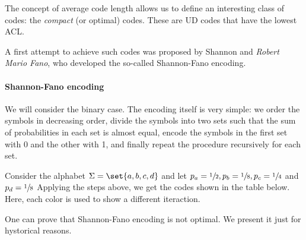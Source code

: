 \documentclass{subfiles}
\begin{document}
    The concept of average code length allows us to define an interesting class of  codes:
        the \emph{compact} (or optimal) codes.
        These are UD codes that have the lowest ACL.

    A first attempt to achieve such codes was proposed by Shannon and \emph{Robert Mario Fano},
        who developed the so-called Shannon-Fano encoding.

    \paragraph{Shannon-Fano encoding}
    We will consider the binary case. 
        The encoding itself is very simple: we order the symbols in decreasing order,
        divide the symbols into two sets such that the sum of probabilities in each set is almost equal, 
        encode the symbols in the first set with 0 and the other with 1,
        and finally repeat the procedure recursively for each set.

    \begin{example*}
        Consider the alphabet \(\Sigma = \set{a, b, c, d}\) and let \(p_{a} = \sfrac{1}{2},
        p_{b} = \sfrac{1}{8}, p_{c} = \sfrac{1}{4}\) and \(p_{d} = \sfrac{1}{8}\)
        Applying the steps above, we get the codes shown in the table below.
        Here, each color is used to show a different iteraction.
        
    \end{example*}

    One can prove that Shannon-Fano encoding is not optimal. 
    We present it just for hystorical reasons.
    \cleardoublepage
\end{document}
